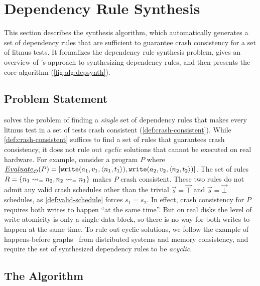 \section{Dependency Rule Synthesis}\label{sec:alg}

This section describes the \depsynth synthesis algorithm,
which automatically generates a set of dependency rules
that are sufficient to guarantee crash consistency for a set of litmus tests.
It formalizes the dependency rule synthesis problem,
gives an overview of \depsynth's approach to synthesizing dependency rules,
and then presents the core \depsynth algorithm (\cref{fig:alg:depsynth}).

\subsection{Problem Statement}\label{sec:alg:problem}

\depsynth solves the problem of 
finding a \emph{single} set of dependency rules 
that makes every litmus test \test
in a set of tests \tests
crash consistent (\cref{def:crash-consistent}).
%
While \cref{def:crash-consistent} suffices to find a set of rules 
that guarantees crash consistency,
it does not rule out \emph{cyclic} solutions that cannot be executed on real hardware.
For example, consider a program $P$
where $\evaluate{P}{\sys} = [\texttt{write}(a_1, v_1, \langle n_1, t_1 \rangle), \texttt{write}(a_2, v_2, \langle n_2, t_2 \rangle)]$.
The set of rules $R = \{ \deprule{n_1}{n_2}{=}, \deprule{n_2}{n_1}{=} \}$
makes $P$ crash consistent.
These two rules do not admit any valid crash schedules
other than the trivial $\vec{s} = \vec{\top}$ and $\vec{s} = \vec{\bot}$ schedules,
as \cref{def:valid-schedule} forces $s_1 = s_2$.
In effect, crash consistency for $P$
requires both writes to happen ``at the same time''.
But on real disks the level of write atomicity is only a single data block,
so there is no way for both writes to happen at the same time.
To rule out cyclic solutions,
we follow the example of happens-before graphs~\cite{lamport:happens-before}
from distributed systems and memory consistency,
and require the set of synthesized dependency rules  to be \emph{acyclic}.\tighten

\subsection{The \depsynth Algorithm}

